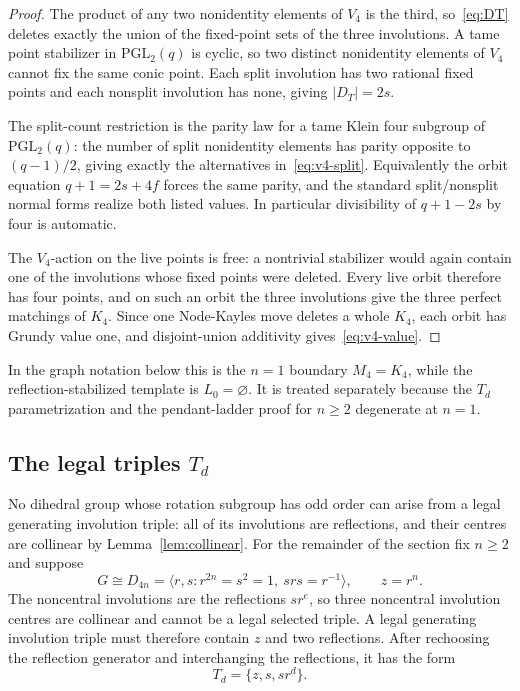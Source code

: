 \documentclass[11pt]{article}
\theoremstyle{definition}
\theoremstyle{remark}
\newcommand{\PGL}{\mathrm{PGL}}
\newcommand{\Mob}{M}
\begin{document}
\begin{proof}
The product of any two nonidentity elements of $V_4$ is the third, so~\eqref{eq:DT} deletes exactly
the union of the fixed-point sets of the three involutions. A tame point stabilizer in $\PGL_2(q)$
is cyclic, so two distinct nonidentity elements of $V_4$ cannot fix the same conic point. Each split
involution has two rational fixed points and each nonsplit involution has none, giving $|D_T|=2s$.

The split-count restriction is the parity law for a tame Klein four subgroup of $\PGL_2(q)$: the
number of split nonidentity elements has parity opposite to $(q-1)/2$, giving exactly the
alternatives in~\eqref{eq:v4-split}. Equivalently the orbit equation $q+1=2s+4f$ forces the same
parity, and the standard split/nonsplit normal forms realize both listed values. In particular
divisibility of $q+1-2s$ by four is automatic.

The $V_4$-action on the live points is free: a nontrivial stabilizer would again contain one of the
involutions whose fixed points were deleted. Every live orbit therefore has four points, and on such
an orbit the three involutions give the three perfect matchings of $K_4$. Since one Node-Kayles move
deletes a whole $K_4$, each orbit has Grundy value one, and disjoint-union additivity
gives~\eqref{eq:v4-value}.
\end{proof}

In the graph notation below this is the $n=1$ boundary $\Mob_4=K_4$, while the reflection-stabilized
template is $L_0=\varnothing$. It is treated separately because the $T_d$ parametrization and the
pendant-ladder proof for $n\ge2$ degenerate at $n=1$.

\subsection{The legal triples \texorpdfstring{$T_d$}{Td}}

No dihedral group whose rotation subgroup has odd order can arise from a legal generating involution
triple: all of its involutions are reflections, and their centres are collinear by
Lemma~\ref{lem:collinear}. For the remainder of the section fix $n\ge2$ and suppose
\[
  G\cong D_{4n}=\langle r,s: r^{2n}=s^2=1,\ srs=r^{-1}\rangle,
  \qquad z=r^n .
\]
The noncentral involutions are the reflections $sr^e$, so three noncentral involution centres are
collinear and cannot be a legal selected triple. A legal generating involution triple must therefore
contain $z$ and two reflections. After rechoosing the reflection generator and interchanging the
reflections, it has the form
\begin{equation}
  T_d=\{z,s,sr^d\}.
  \label{eq:Td}
\end{equation}
\end{document}
